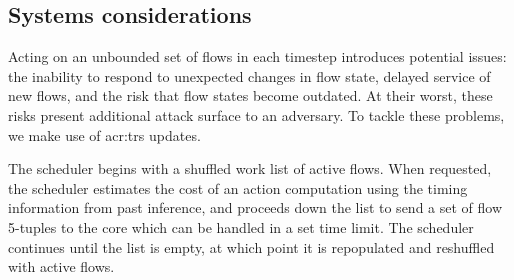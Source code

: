 \subsection{Systems considerations}\label{sec:systems-considerations}
%
%

Acting on an unbounded set of flows in each timestep introduces potential issues: the inability to respond to unexpected changes in flow state, delayed service of new flows, and the risk that flow states become outdated.
At their worst, these risks present additional attack surface to an adversary.
To tackle these problems, we make use of \gls{acr:trs} updates.

The scheduler begins with a shuffled work list of active flows.
When requested, the scheduler estimates the cost of an action computation using the timing information from past inference, and proceeds down the list to send a set of flow 5-tuples to the core which can be handled in a set time limit.
The scheduler continues until the list is empty, at which point it is repopulated and reshuffled with active flows.

